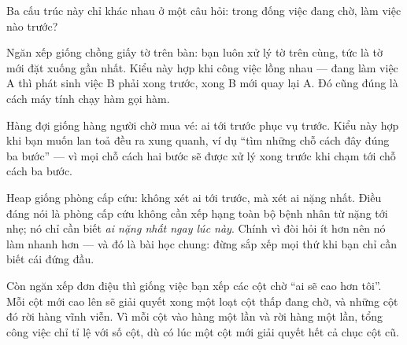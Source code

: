 \documentclass[../../algorithm.tex]{subfiles}
\begin{document}
\begin{dongian}
Ba cấu trúc này chỉ khác nhau ở một câu hỏi: trong đống việc đang chờ, làm việc nào trước?

Ngăn xếp giống chồng giấy tờ trên bàn: bạn luôn xử lý tờ trên cùng, tức là tờ mới đặt xuống gần nhất. Kiểu này hợp khi công việc lồng nhau --- đang làm việc A thì phát sinh việc B phải xong trước, xong B mới quay lại A. Đó cũng đúng là cách máy tính chạy hàm gọi hàm.

Hàng đợi giống hàng người chờ mua vé: ai tới trước phục vụ trước. Kiểu này hợp khi bạn muốn lan toả đều ra xung quanh, ví dụ ``tìm những chỗ cách đây đúng ba bước'' --- vì mọi chỗ cách hai bước sẽ được xử lý xong trước khi chạm tới chỗ cách ba bước.

Heap giống phòng cấp cứu: không xét ai tới trước, mà xét ai nặng nhất. Điều đáng nói là phòng cấp cứu không cần xếp hạng toàn bộ bệnh nhân từ nặng tới nhẹ; nó chỉ cần biết \emph{ai nặng nhất ngay lúc này}. Chính vì đòi hỏi ít hơn nên nó làm nhanh hơn --- và đó là bài học chung: đừng sắp xếp mọi thứ khi bạn chỉ cần biết cái đứng đầu.

Còn ngăn xếp đơn điệu thì giống việc bạn xếp các cột chờ ``ai sẽ cao hơn tôi''. Mỗi cột mới cao lên sẽ giải quyết xong một loạt cột thấp đang chờ, và những cột đó rời hàng vĩnh viễn. Vì mỗi cột vào hàng một lần và rời hàng một lần, tổng công việc chỉ tỉ lệ với số cột, dù có lúc một cột mới giải quyết hết cả chục cột cũ.
\end{dongian}
\end{document}
